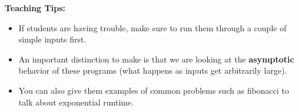 \begin{parts}
\end{parts}

\begin{guide}    
    \textbf{Teaching Tips:}
    \begin{itemize}
        \item If students are having trouble, make sure to run them through a couple of simple inputs first.
        \item An important distinction to make is that we are looking at the \textbf{asymptotic} behavior of these programs (what happens as inputs get arbitrarily large).
        \item You can also give them examples of common problems such as fibonacci to talk about exponential runtime.
    \end{itemize}
\end{guide}
